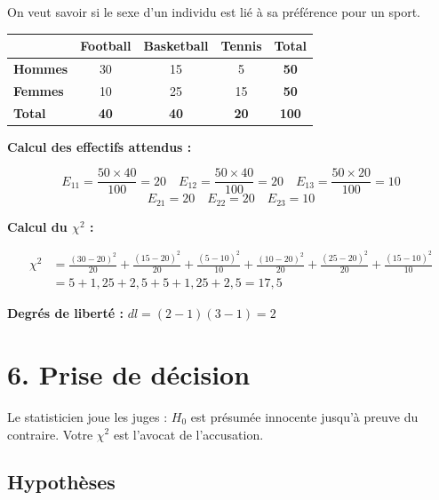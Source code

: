 \documentclass[12pt, a4paper]{article}
\begin{document}
On veut savoir si le sexe d'un individu est lié à sa préférence pour un sport.

\vspace{0.5em}
\begin{center}
\begin{tabular}{lcccc}
  \toprule
   & \textbf{Football} & \textbf{Basketball} & \textbf{Tennis} & \textbf{Total} \\
  \midrule
  \textbf{Hommes} & 30 & 15 & 5  & \textbf{50}  \\
  \textbf{Femmes} & 10 & 25 & 15 & \textbf{50}  \\
  \textbf{Total}  & \textbf{40} & \textbf{40} & \textbf{20} & \textbf{100} \\
  \bottomrule
\end{tabular}
\end{center}

\vspace{0.5em}

\textbf{Calcul des effectifs attendus :}

\[
  E_{11} = \frac{50 \times 40}{100} = 20 \quad
  E_{12} = \frac{50 \times 40}{100} = 20 \quad
  E_{13} = \frac{50 \times 20}{100} = 10
\]
\[
  E_{21} = 20 \quad E_{22} = 20 \quad E_{23} = 10
\]

\textbf{Calcul du $\chi^2$ :}

\begin{align*}
  \chi^2 &= \frac{(30-20)^2}{20} + \frac{(15-20)^2}{20} + \frac{(5-10)^2}{10}
            + \frac{(10-20)^2}{20} + \frac{(25-20)^2}{20} + \frac{(15-10)^2}{10} \\
         &= 5 + 1{,}25 + 2{,}5 + 5 + 1{,}25 + 2{,}5 = 17{,}5
\end{align*}

\textbf{Degrés de liberté :} $dl = (2-1)(3-1) = 2$

\section{6. Prise de décision}

\begin{humourbox}
Le statisticien joue les juges : $H_0$ est présumée innocente jusqu'à preuve du
contraire. Votre $\chi^2$ est l'avocat de l'accusation.
\end{humourbox}

\subsection{Hypothèses}
\end{document}

